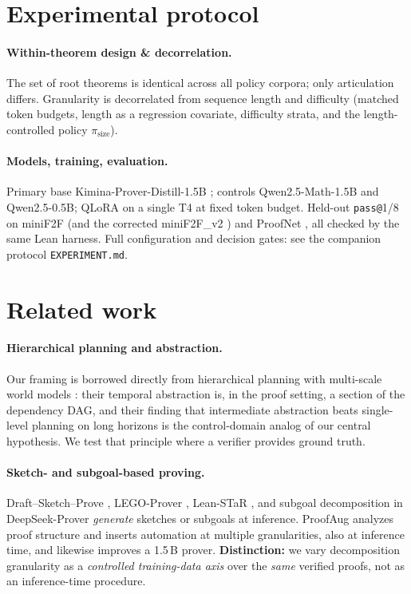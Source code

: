 \documentclass[11pt]{article}
\begin{document}
\section{Experimental protocol}
\label{sec:protocol}

\paragraph{Within-theorem design \& decorrelation.} The set of root theorems
is identical across all policy corpora; only articulation differs. Granularity
is decorrelated from sequence length and difficulty (matched token budgets,
length as a regression covariate, difficulty strata, and the
length-controlled policy $\pi_{\mathrm{size}}$).

\paragraph{Models, training, evaluation.} Primary base
Kimina-Prover-Distill-1.5B \citep{kimina2025}; controls Qwen2.5-Math-1.5B
and Qwen2.5-0.5B;
QLoRA on a single T4 at fixed token budget. Held-out \texttt{pass@}1/8 on
miniF2F \citep{zheng2022minif2f} (and the corrected miniF2F\_v2
\citep{minif2f_v2}) and ProofNet \citep{azerbayev2023proofnet}, all checked by
the same Lean harness. Full configuration and decision gates: see the
companion protocol \texttt{EXPERIMENT.md}.

\section{Related work}
\label{sec:related}

\paragraph{Hierarchical planning and abstraction.} Our framing is borrowed
directly from hierarchical planning with multi-scale world models
\citep{zhang2026hierarchical}: their temporal abstraction is, in the proof
setting, a section of the dependency DAG, and their finding that intermediate
abstraction beats single-level planning on long horizons is the control-domain
analog of our central hypothesis. We test that principle where a verifier
provides ground truth.

\paragraph{Sketch- and subgoal-based proving.} Draft--Sketch--Prove
\citep{jiang2023draft}, LEGO-Prover \citep{wang2024lego}, Lean-STaR
\citep{lin2024leanstar}, and subgoal decomposition in DeepSeek-Prover
\citep{xin2024deepseekprover,ren2025deepseekproverv2} \emph{generate}
sketches or subgoals at inference. ProofAug \citep{liu2025proofaug} analyzes proof structure and
inserts automation at multiple granularities, also at inference time, and
likewise improves a 1.5\,B prover. \textbf{Distinction:} we vary decomposition
granularity as a \emph{controlled training-data axis} over the \emph{same}
verified proofs, not as an inference-time procedure.
\end{document}
